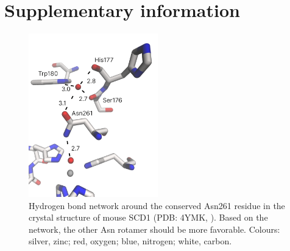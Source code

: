 \chapter{Supplementary information}

\begin{figure}[htbp]
    \centering
    \includegraphics[width=0.5\textwidth]{Figures/crystal_water.png}
    \caption{Hydrogen bond network around the conserved Asn261 residue in the crystal structure of mouse SCD1 (PDB: 4YMK, \cite{Bai2015}). Based on the network, the other Asn rotamer should be more favorable. Colours: silver, zinc; red, oxygen; blue, nitrogen; white, carbon.}
    \label{fig:Crystal_water}
\end{figure}

